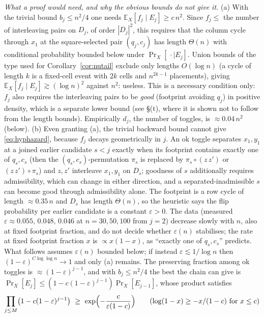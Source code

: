 \emph{What a proof would need, and why the obvious bounds do not give
it.}  (a) With the trivial bound $b_j\le n^2/4$ one needs $\mathbb
E_X[f_j\mid E_j]\ge c\,n^2$.  Since $f_j\le$ the number of interleaving
pairs on $D_j$, of order $|D_j|^2$, this requires that the
column cycle through $x_1$ at the square-selected pair $(q_j,c_j)$ has
length $\Theta(n)$ with conditional probability bounded below under
$\Pr_X[\,\cdot\mid E_j]$.  Union bounds of the type used for
Corollary~\ref{cor:nutail} exclude only lengths $O(\log n)$ (a cycle of
length $k$ is a fixed-cell event with $2k$ cells and $n^{2k-1}$
placements), giving $\mathbb E_X[f_j\mid E_j]\gtrsim(\log n)^2$ against
$n^2$: useless.  This is a necessary condition only: $f_j$ also
requires the interleaving pairs to be \emph{good} (footprint avoiding
$q_j$) in positive density, which is a separate lower bound (see
\S(t), where it is shown not to follow from the length bounds).
Empirically $d_j$, the number of toggles, is $\approx0.04\,n^2$
(below).
(b) Even granting (a), the trivial backward bound cannot give
\eqref{eq:hyphazard}, because $f_j$ decays geometrically in $j$.  An
ok toggle separates $x_1,y_1$ at a joined earlier candidate $s<j$
exactly when its footprint contains exactly one of $q_s,c_s$ (then the
$(q_s,c_s)$-permutation $\pi_s$ is replaced by $\pi_s\circ(z\,z')$ or
$(z\,z')\circ\pi_s$) and $z,z'$ interleave $x_1,y_1$ on $D_s$;
goodness of $s$ additionally requires admissibility, which can change
in either direction, and a separated-inadmissible $s$ can become good
through admissibility alone.  The footprint is a row cycle of length
$\approx0.35\,n$ and $D_s$ has length $\Theta(n)$, so the heuristic says the flip
probability per earlier candidate is a constant $\varepsilon>0$.  The
data (measured $\varepsilon\approx0.055,\,0.048,\,0.046$ at
$n=30,50,100$ from $j=2$) decrease slowly with $n$, also at fixed
footprint fraction, and do not decide whether $\varepsilon(n)$
stabilises; the rate at fixed footprint fraction $x$ is
$\propto x(1-x)$, as ``exactly one of $q_s,c_s$'' predicts.  What
follows assumes $\varepsilon(n)$ bounded below; if instead
$\varepsilon\lesssim1/\log n$ then $(1-\varepsilon)^{C\log\log n}\to1$
and only (a) remains.  The preserving fraction among ok toggles is
$\approx(1-\varepsilon)^{j-1}$, and with $b_j\le n^2/4$ the best the
chain can give is $\Pr_X[E_j]\le(1-c(1-\varepsilon)^{j-1})\Pr_X[E_{j-1}]$,
whose product satisfies
\[
\prod_{j\le M}\bigl(1-c(1-\varepsilon)^{j-1}\bigr)\ \ge\
\exp\Bigl(-\frac{c}{\varepsilon(1-c)}\Bigr)
\qquad(\log(1-x)\ge-x/(1-c)\text{ for }x\le c)
\]
